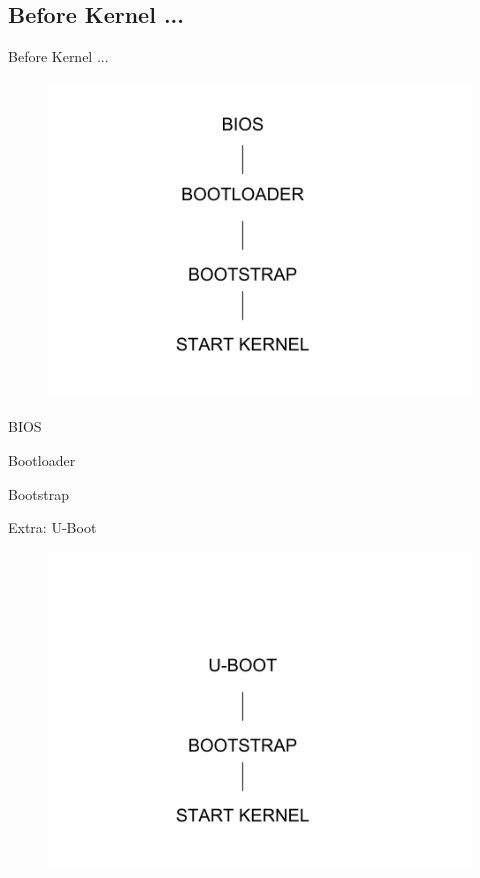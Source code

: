 \documentclass{workshop}
\begin{document}
\subsection{Before Kernel ...}
\begin{frame}{Before Kernel ...}
      \begin{figure}
         \includegraphics[scale=0.3]{img/boot.png}
      \end{figure}
\end{frame}

\begin{frame}{BIOS}
\end{frame}

\begin{frame}{Bootloader}
\end{frame}

\begin{frame}{Bootstrap}
\end{frame}

\begin{frame}{Extra: U-Boot}
      \begin{figure}
         \includegraphics[scale=0.3]{img/u-boot.png}
      \end{figure}
\end{frame}
\end{document}
